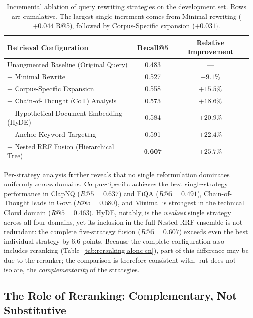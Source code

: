 \begin{table}[h]
\centering
\small
\begin{tabular}{lcc}
\toprule
\textbf{Retrieval Configuration} & \textbf{Recall@5} & \textbf{Relative Improvement} \\
\midrule
Unaugmented Baseline (Original Query) & 0.483 & --- \\
+ Minimal Rewrite & 0.527 & $+9.1\%$ \\
+ Corpus-Specific Expansion & 0.558 & $+15.5\%$ \\
+ Chain-of-Thought (CoT) Analysis & 0.573 & $+18.6\%$ \\
+ Hypothetical Document Embedding (HyDE) & 0.584 & $+20.9\%$ \\
+ Anchor Keyword Targeting & 0.591 & $+22.4\%$ \\
+ Nested RRF Fusion (Hierarchical Tree) & \textbf{0.607} & \textbf{$+25.7\%$} \\
\bottomrule
\end{tabular}
\caption{Incremental ablation of query rewriting strategies on the development set. Rows are cumulative. The largest single increment comes from Minimal rewriting ($+0.044$ R@5), followed by Corpus-Specific expansion ($+0.031$).}
\label{tab:rewrite-ablation-en}
\end{table}

Per-strategy analysis further reveals that no single reformulation dominates uniformly across domains: Corpus-Specific achieves the best single-strategy performance in ClapNQ ($R@5{=}0.637$) and FiQA ($R@5{=}0.491$), Chain-of-Thought leads in Govt ($R@5{=}0.580$), and Minimal is strongest in the technical Cloud domain ($R@5{=}0.463$). HyDE, notably, is the \emph{weakest} single strategy across all four domains, yet its inclusion in the full Nested RRF ensemble is not redundant: the complete five-strategy fusion ($R@5{=}0.607$) exceeds even the best individual strategy by $6.6$ points. Because the complete configuration also includes reranking (Table~\ref{tab:reranking-alone-en}), part of this difference may be due to the reranker; the comparison is therefore consistent with, but does not isolate, the \emph{complementarity} of the strategies.

\subsection{The Role of Reranking: Complementary, Not Substitutive}
\label{sec:reranking-role}

